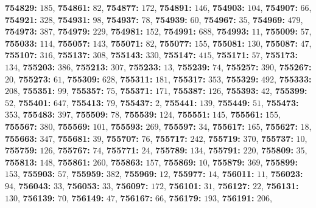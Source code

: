 \textsf{\bfseries 754829:} $185$, \textsf{\bfseries 754861:} $82$, \textsf{\bfseries 754877:} $172$, \textsf{\bfseries 754891:} $146$, \textsf{\bfseries 754903:} $104$, \textsf{\bfseries 754907:} $66$, \textsf{\bfseries 754921:} $328$, \textsf{\bfseries 754931:} $98$, \textsf{\bfseries 754937:} $78$, \textsf{\bfseries 754939:} $60$, \textsf{\bfseries 754967:} $35$, \textsf{\bfseries 754969:} $479$, \textsf{\bfseries 754973:} $387$, \textsf{\bfseries 754979:} $229$, \textsf{\bfseries 754981:} $152$, \textsf{\bfseries 754991:} $688$, \textsf{\bfseries 754993:} $11$, \textsf{\bfseries 755009:} $57$, \textsf{\bfseries 755033:} $114$, \textsf{\bfseries 755057:} $143$, \textsf{\bfseries 755071:} $82$, \textsf{\bfseries 755077:} $155$, \textsf{\bfseries 755081:} $130$, \textsf{\bfseries 755087:} $47$, \textsf{\bfseries 755107:} $316$, \textsf{\bfseries 755137:} $308$, \textsf{\bfseries 755143:} $330$, \textsf{\bfseries 755147:} $415$, \textsf{\bfseries 755171:} $57$, \textsf{\bfseries 755173:} $134$, \textsf{\bfseries 755203:} $386$, \textsf{\bfseries 755213:} $307$, \textsf{\bfseries 755233:} $13$, \textsf{\bfseries 755239:} $74$, \textsf{\bfseries 755257:} $390$, \textsf{\bfseries 755267:} $20$, \textsf{\bfseries 755273:} $61$, \textsf{\bfseries 755309:} $628$, \textsf{\bfseries 755311:} $181$, \textsf{\bfseries 755317:} $353$, \textsf{\bfseries 755329:} $492$, \textsf{\bfseries 755333:} $208$, \textsf{\bfseries 755351:} $99$, \textsf{\bfseries 755357:} $75$, \textsf{\bfseries 755371:} $171$, \textsf{\bfseries 755387:} $126$, \textsf{\bfseries 755393:} $42$, \textsf{\bfseries 755399:} $52$, \textsf{\bfseries 755401:} $647$, \textsf{\bfseries 755413:} $79$, \textsf{\bfseries 755437:} $2$, \textsf{\bfseries 755441:} $139$, \textsf{\bfseries 755449:} $51$, \textsf{\bfseries 755473:} $353$, \textsf{\bfseries 755483:} $397$, \textsf{\bfseries 755509:} $78$, \textsf{\bfseries 755539:} $124$, \textsf{\bfseries 755551:} $145$, \textsf{\bfseries 755561:} $155$, \textsf{\bfseries 755567:} $380$, \textsf{\bfseries 755569:} $101$, \textsf{\bfseries 755593:} $269$, \textsf{\bfseries 755597:} $34$, \textsf{\bfseries 755617:} $165$, \textsf{\bfseries 755627:} $18$, \textsf{\bfseries 755663:} $347$, \textsf{\bfseries 755681:} $39$, \textsf{\bfseries 755707:} $76$, \textsf{\bfseries 755717:} $242$, \textsf{\bfseries 755719:} $370$, \textsf{\bfseries 755737:} $10$, \textsf{\bfseries 755759:} $126$, \textsf{\bfseries 755767:} $74$, \textsf{\bfseries 755771:} $24$, \textsf{\bfseries 755789:} $134$, \textsf{\bfseries 755791:} $220$, \textsf{\bfseries 755809:} $35$, \textsf{\bfseries 755813:} $148$, \textsf{\bfseries 755861:} $260$, \textsf{\bfseries 755863:} $157$, \textsf{\bfseries 755869:} $10$, \textsf{\bfseries 755879:} $369$, \textsf{\bfseries 755899:} $153$, \textsf{\bfseries 755903:} $57$, \textsf{\bfseries 755959:} $382$, \textsf{\bfseries 755969:} $12$, \textsf{\bfseries 755977:} $14$, \textsf{\bfseries 756011:} $11$, \textsf{\bfseries 756023:} $94$, \textsf{\bfseries 756043:} $33$, \textsf{\bfseries 756053:} $33$, \textsf{\bfseries 756097:} $172$, \textsf{\bfseries 756101:} $31$, \textsf{\bfseries 756127:} $22$, \textsf{\bfseries 756131:} $130$, \textsf{\bfseries 756139:} $70$, \textsf{\bfseries 756149:} $47$, \textsf{\bfseries 756167:} $66$, \textsf{\bfseries 756179:} $193$, \textsf{\bfseries 756191:} $206$, 
